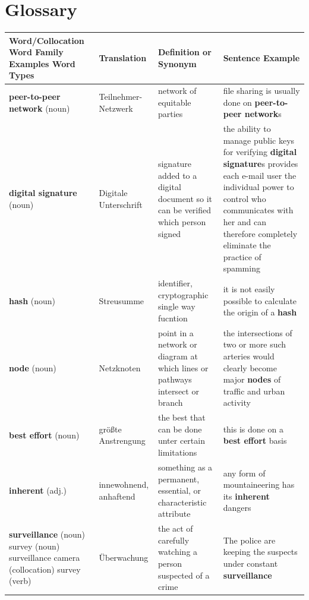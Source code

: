 \documentclass[english, DIV=calc, BCOR=5mm, fontsize=11pt, portrait]{scrartcl}	 %
\begin{document}
\newpage 


\section{Glossary}%

\begin{longtable}{p{3cm}||p{3cm}|p{3cm}|p{4cm}}
Word/Collocation \newline
Word Family Examples \newline
Word Types &
Translation &
Definition or \newline
Synonym &
Sentence Example \\
\endhead
\hline
\hline
\textbf{peer-to-peer network} (noun)	& Teilnehmer-Netzwerk			& network of equitable parties					& file sharing is usually done on \textbf{peer-to-peer network}s	\\
\hline
\textbf{digital signature} (noun)		& Digitale Unterschrift			& signature added to a digital document so it can be verified which person signed	& the ability to manage public keys for verifying \textbf{digital signature}s provides each e-mail user the individual power to control who communicates with her and can therefore completely eliminate the practice of spamming	\\
\hline
\textbf{hash} (noun)				& Streu\-sum\-me					& identifier, cryptographic single way fucntion	& it is not easily possible to calculate the origin of a \textbf{hash} 	\\
\hline
\textbf{node} (noun)				& Netzknoten					& point in a network or diagram at which lines or pathways intersect or branch	& the intersections of two or more such arteries would clearly become major \textbf{nodes} of traffic and urban activity	\\
\hline
\textbf{best effort} (noun)		& größte Anstrengung			& the best that can be done unter certain limitations	& this is done on a \textbf{best effort} basis	\\
\hline
\textbf{inherent} (adj.)			& innewohnend, anhaftend		& something as a permanent, essential, or characteristic attribute	& any form of mountaineering has its \textbf{inherent} dangers	\\
\hline
\textbf{surveillance} (noun)	\newline survey (noun) \newline surveillance camera (collocation) \newline survey (verb) & Überwachung	& the act of carefully watching a person suspected of a crime & The police are keeping the suspects under constant \textbf{surveillance} \\

\end{longtable}
\end{document}
